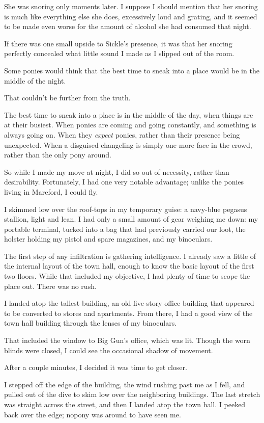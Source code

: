 She was snoring only moments later. I suppose I should mention that her snoring is much like everything else she does, excessively loud and grating, and it seemed to be made even worse for the amount of alcohol she had consumed that night.

If there was one small upside to Sickle’s presence, it was that her snoring perfectly concealed what little sound I made as I slipped out of the room.

{\br}%
Some ponies would think that the best time to sneak into a place would be in the middle of the night.

That couldn’t be further from the truth.

The best time to sneak into a place is in the middle of the day, when things are at their busiest. When ponies are coming and going constantly, and something is always going on. When they \textit{expect} ponies, rather than their presence being unexpected. When a disguised changeling is simply one more face in the crowd, rather than the only pony around.

So while I made my move at night, I did so out of necessity, rather than desirability. Fortunately, I had one very notable advantage; unlike the ponies living in Mareford, I could fly.

I skimmed low over the roof-tops in my temporary guise: a navy-blue pegasus stallion, light and lean. I had only a small amount of gear weighing me down: my portable terminal, tucked into a bag that had previously carried our loot, the holster holding my pistol and spare magazines, and my binoculars.

The first step of any infiltration is gathering intelligence. I already saw a little of the internal layout of the town hall, enough to know the basic layout of the first two floors. While that included my objective, I had plenty of time to scope the place out. There was no rush.

I landed atop the tallest building, an old five-story office building that appeared to be converted to stores and apartments. From there, I had a good view of the town hall building through the lenses of my binoculars.

That included the window to Big Gun’s office, which was lit. Though the worn blinds were closed, I could see the occasional shadow of movement.

After a couple minutes, I decided it was time to get closer.

I stepped off the edge of the building, the wind rushing past me as I fell, and pulled out of the dive to skim low over the neighboring buildings. The last stretch was straight across the street, and then I landed atop the town hall. I peeked back over the edge; nopony was around to have seen me.

